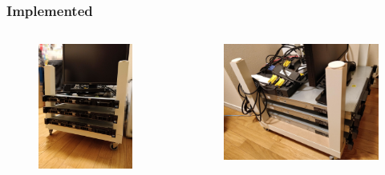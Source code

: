 \documentclass[aspectratio=169,11pt,hyperref={colorlinks=true}]{beamer}
\begin{document}
\begin{frame}
  \frametitle{Implemented}
  \begin{columns}[T]
    \begin{column}{0.5\textwidth}
      \begin{figure}
        \includegraphics[width=0.9\textwidth]{server_front.jpg}
      \end{figure}
    \end{column}
    \begin{column}{0.5\textwidth}
      \begin{figure}
        \includegraphics[width=1.0\textwidth]{server_side.jpg}
      \end{figure}
    \end{column}
  \end{columns}
\end{frame}
\end{document}
